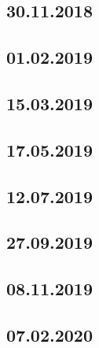 \documentclass[a4paper,12p]{article}
\begin{document}
	\subsection{30.11.2018}
	\subsection{01.02.2019}
	
	\newpage
	\subsection{15.03.2019}
		
	
	
	\newpage	
	\subsection{17.05.2019}
	
	
	\newpage
	\subsection{12.07.2019}
	
	
	
	
	
	\newpage
	\subsection{27.09.2019}
	\subsection{08.11.2019}
	\subsection{07.02.2020}
\end{document}
